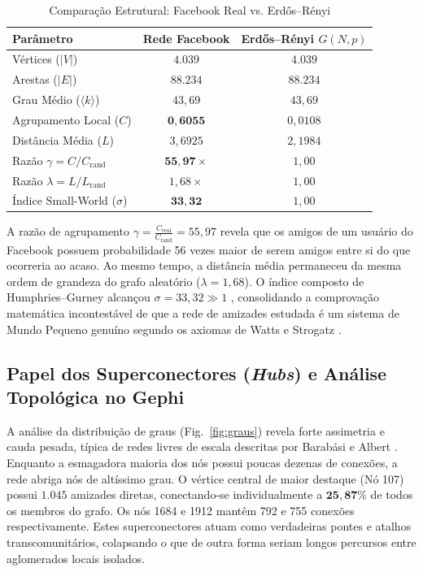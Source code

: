 \documentclass[conference]{IEEEtran}
\begin{document}
\begin{table}[htbp]
\caption{Comparação Estrutural: Facebook Real vs. Erdős--Rényi}
\label{tab:watts_strogatz}
\centering
\begin{tabular}{lcc}
\toprule
\textbf{Parâmetro} & \textbf{Rede Facebook} & \textbf{Erdős--Rényi $G(N, p)$} \\
\midrule
Vértices ($|V|$) & $4.039$ & $4.039$ \\
Arestas ($|E|$) & $88.234$ & $88.234$ \\
Grau Médio ($\langle k \rangle$) & $43,69$ & $43,69$ \\
Agrupamento Local ($C$) & $\mathbf{0,6055}$ & $0,0108$ \\
Distância Média ($L$) & $3,6925$ & $2,1984$ \\
Razão $\gamma = C / C_{\text{rand}}$ & $\mathbf{55,97\times}$ & $1,00$ \\
Razão $\lambda = L / L_{\text{rand}}$ & $1,68\times$ & $1,00$ \\
Índice Small-World ($\sigma$) & $\mathbf{33,32}$ & $1,00$ \\
\bottomrule
\end{tabular}
\end{table}

A razão de agrupamento $\gamma = \frac{C_{\text{real}}}{C_{\text{rand}}} = 55,97$ revela que os amigos de um usuário do Facebook possuem probabilidade 56 vezes maior de serem amigos entre si do que ocorreria ao acaso. Ao mesmo tempo, a distância média permaneceu da mesma ordem de grandeza do grafo aleatório ($\lambda = 1,68$). O índice composto de Humphries--Gurney alcançou $\sigma = 33,32 \gg 1$ \cite{humphries2008network}, consolidando a comprovação matemática incontestável de que a rede de amizades estudada é um sistema de Mundo Pequeno genuíno segundo os axiomas de Watts e Strogatz \cite{watts1998collective}.

\subsection{Papel dos Superconectores (\textit{Hubs}) e Análise Topológica no Gephi}
A análise da distribuição de graus (Fig.~\ref{fig:graus}) revela forte assimetria e cauda pesada, típica de redes livres de escala descritas por Barabási e Albert \cite{barabasi1999emergence}. Enquanto a esmagadora maioria dos nós possui poucas dezenas de conexões, a rede abriga nós de altíssimo grau. O vértice central de maior destaque (Nó 107) possui $1.045$ amizades diretas, conectando-se individualmente a $\mathbf{25,87\%}$ de todos os membros do grafo. Os nós 1684 e 1912 mantêm 792 e 755 conexões respectivamente. Estes superconectores atuam como verdadeiras pontes e atalhos transcomunitários, colapsando o que de outra forma seriam longos percursos entre aglomerados locais isolados.
\end{document}
